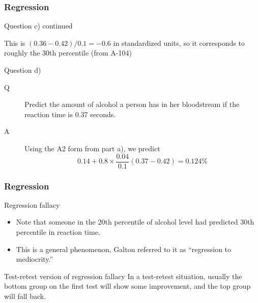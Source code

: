 \documentclass[handout]{beamer}
\begin{document}
   \begin{frame} \frametitle{Regression}

   \begin{block}
   {Question c) continued}

   This is $(0.36-0.42)/0.1=-0.6$ in standardized units, so
   it corresponds to roughly the 30th percentile (from A-104)
   \end{block}

   \begin{block}
   {Question d)}
   \begin{description}
   \item[Q]    Predict the amount of alcohol a person has in
   her bloodstream if the reaction time is 0.37 seconds.
   \item[A] Using the A2 form from part a), we predict
   $$
   0.14 + 0.8 \times \frac{0.04}{0.1} (0.37-0.42) = 0.124 \%
   $$
   \end{description}
   \end{block}
   \end{frame}


   \begin{frame} \frametitle{Regression}

   \begin{block}
   {Regression fallacy}

   \begin{itemize}
   \item    Note that someone in the 20th percentile of alcohol
   level had predicted 30th percentile in reaction time.
   \item This is a general phenomenon, Galton referred to it as
   ``regression to mediocrity.''
   \end{itemize}

   \end{block}

   \begin{block}
   {Test-retest version of regression fallacy}
   In a test-retest situation, usually the bottom
   group on the first test will show some improvement,
   and the top group will fall back.
   \end{block}
   \end{frame}
\end{document}
